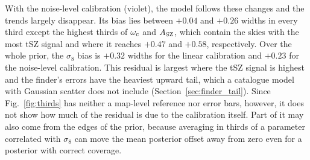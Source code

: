 With the noise-level calibration (violet), the model follows these changes and the trends largely
disappear. Its bias lies between $+0.04$ and $+0.26$ widths in every third except the highest thirds of
$\omega_\mathrm{c}$ and $A_\mathrm{SZ}$, which contain the skies with the most tSZ signal and where it reaches $+0.47$ and
$+0.58$, respectively. Over the whole prior, the $\sigma_8$ bias is $+0.32$ widths for the linear
calibration and $+0.23$ for the noise-level calibration. This residual is largest where the tSZ signal is
highest and the finder's errors have the heaviest upward tail, which a catalogue model with Gaussian
scatter does not include (Section~\ref{sec:finder_tail}). Since Fig.~\ref{fig:thirds} has neither a
map-level reference nor error bars, however, it does not show how much of the residual is due to the
calibration itself. Part of it may also come from the edges of the prior, because averaging in thirds of a
parameter correlated with $\sigma_8$ can move the mean posterior offset away from zero even for a
posterior with correct coverage.
